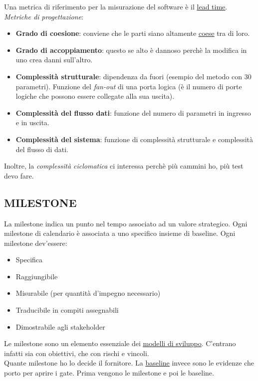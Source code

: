 		Una metrica di riferimento per la misurazione del software è il \underline{\hyperref[leadtime]{lead time}}. \\
		\textit{Metriche di progettazione}:
		\begin{itemize}
			\item \textbf{Grado di coesione}: conviene che le parti siano altamente \underline{\hyperref[coeso]{coese}} tra di loro.
			\item \textbf{Grado di accoppiamento}: questo se alto è dannoso perchè la modifica in uno crea danni sull'altro.
			\item \textbf{Complessità strutturale}: dipendenza da fuori (esempio del metodo con 30 parametri). Funzione del \textit{fan-out} di una porta logica (è il numero di porte logiche che possono essere collegate alla sua uscita).
			\item \textbf{Complessità del flusso dati}: funzione del numero di parametri in ingresso e in uscita.
			\item \textbf{Complessità del sistema}: funzione di complessità strutturale e complessità del flusso di dati.
		\end{itemize}
		Inoltre, la \textit{complessità ciclomatica} ci interessa perchè più cammini ho, più test devo fare.


		\subsection{MILESTONE}	 \label{milestone}
		La milestone indica un punto nel tempo associato ad un valore strategico. Ogni milestone di calendario è associata a uno specifico insieme di baseline. Ogni milestone dev'essere:
		\begin{itemize}
			\item Specifica
			\item Raggiungibile
			\item Misurabile (per quantità d'impegno necessario)
			\item Traducibile  in compiti assegnabili
			\item Dimostrabile agli stakeholder
		\end{itemize}
		Le milestone sono un elemento essenziale dei
		 \underline{\hyperref[modelli]{modelli di sviluppo}}.
		C'entrano infatti sia con obiettivi, che con rischi e vincoli. \\
		Quante milestone ho lo decide il fornitore. La \underline{\hyperref[baseline]{baseline}} invece sono le evidenze che porto per aprire i gate. Prima vengono le milestone e poi le baseline. \\


